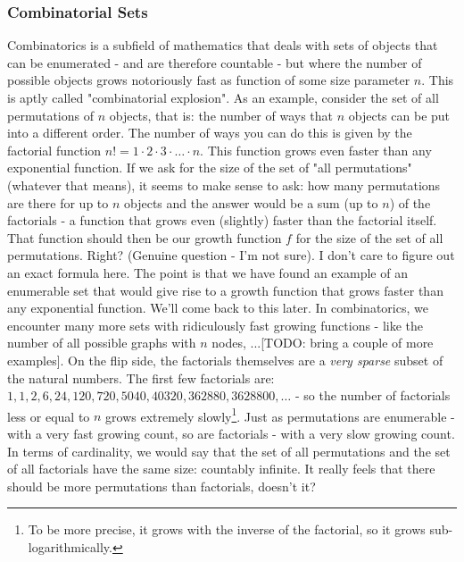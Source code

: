 \documentclass[12pt]{article}
\begin{document}
\subsubsection{Combinatorial Sets}
Combinatorics is a subfield of mathematics that deals with sets of objects that can be enumerated - and are therefore countable - but where the number of possible objects grows notoriously fast as function of some size parameter $n$. This is aptly called "combinatorial explosion". As an example, consider the set of all permutations of $n$ objects, that is: the number of ways that $n$ objects can be put into a different order. The number of ways you can do this is given by the factorial function $n! = 1\cdot 2\cdot 3\cdot \ldots \cdot n$. This function grows even faster than any exponential function. If we ask for the size of the set of "all permutations" (whatever that means), it seems to make sense to ask: how many permutations are there for up to $n$ objects and the answer would be a sum (up to $n$) of the factorials - a function that grows even (slightly) faster than the factorial itself. That function should then be our growth function $f$ for the size of the set of all permutations. Right? (Genuine question - I'm not sure). I don't care to figure out an exact formula here. The point is that we have found an example of an enumerable set that would give rise to a growth function that grows faster than any exponential function. We'll come back to this later. In combinatorics, we encounter many more sets with ridiculously fast growing functions - like the number of all possible graphs with $n$ nodes, ...[TODO: bring a couple of more examples]. On the flip side, the factorials themselves are a \emph{very sparse} subset of the natural numbers. The first few factorials are: $1,1,2,6,24,120,720,5040,40320,362880,3628800,\ldots$ - so the number of factorials less or equal to $n$ grows extremely slowly\footnote{To be more precise, it grows with the inverse of the factorial, so it grows sub-logarithmically.}. Just as permutations are enumerable - with a very fast growing count, so are factorials - with a very slow growing count. In terms of cardinality, we would say that the set of all permutations and the set of all factorials have the same size: countably infinite. It really feels that there should be more permutations than factorials, doesn't it?

\end{document}
